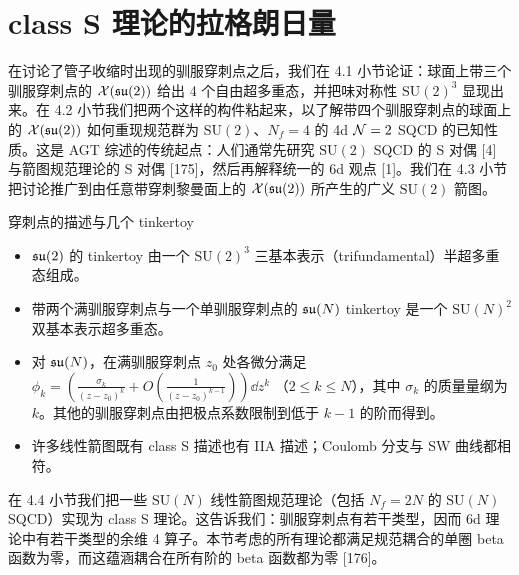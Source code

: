 
\section{class S 理论的拉格朗日量}

在讨论了管子收缩时出现的驯服穿刺点之后，我们在 4.1 小节论证：球面上带三个驯服穿刺点的 $\mathcal{X}(\mathfrak{su}(2))$ 给出 4 个自由超多重态，并把味对称性 $\mathrm{SU}(2)^3$ 显现出来。在 4.2 小节我们把两个这样的构件粘起来，以了解带四个驯服穿刺点的球面上的 $\mathcal{X}(\mathfrak{su}(2))$ 如何重现规范群为 $\mathrm{SU}(2)$、$N_f=4$ 的 4d $\mathcal{N}=2$ SQCD 的已知性质。这是 AGT 综述的传统起点：人们通常先研究 $\mathrm{SU}(2)$ SQCD 的 S 对偶 [4] 与箭图规范理论的 S 对偶 [175]，然后再解释统一的 6d 观点 [1]。我们在 4.3 小节把讨论推广到由任意带穿刺黎曼面上的 $\mathcal{X}(\mathfrak{su}(2))$ 所产生的广义 $\mathrm{SU}(2)$ 箭图。

\begin{keybox}{穿刺点的描述与几个 tinkertoy}
\begin{itemize}[leftmargin=1.4em,itemsep=1pt,topsep=1pt]
  \item $\mathfrak{su}(2)$ 的 tinkertoy 由一个 $\mathrm{SU}(2)^3$ 三基本表示（trifundamental）半超多重态组成。
  \item 带两个满驯服穿刺点与一个单驯服穿刺点的 $\mathfrak{su}(N)$ tinkertoy 是一个 $\mathrm{SU}(N)^2$ 双基本表示超多重态。
  \item 对 $\mathfrak{su}(N)$，在满驯服穿刺点 $z_0$ 处各微分满足
        $\phi_k=\left(\frac{\sigma_k}{(z-z_0)^k}+O\!\left(\frac{1}{(z-z_0)^{k-1}}\right)\right)\dd z^k$
        （$2\le k\le N$），其中 $\sigma_k$ 的质量量纲为 $k$。其他的驯服穿刺点由把极点系数限制到低于 $k-1$ 的阶而得到。
  \item 许多线性箭图既有 class S 描述也有 IIA 描述；Coulomb 分支与 SW 曲线都相符。
\end{itemize}
\end{keybox}


在 4.4 小节我们把一些 $\mathrm{SU}(N)$ 线性箭图规范理论（包括 $N_f=2N$ 的 $\mathrm{SU}(N)$ SQCD）实现为 class S 理论。这告诉我们：驯服穿刺点有若干类型，因而 6d 理论中有若干类型的余维 4 算子。本节考虑的所有理论都满足规范耦合的单圈 beta 函数为零，而这蕴涵耦合在所有阶的 beta 函数都为零 [176]。

